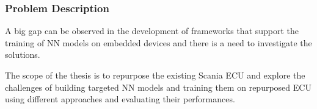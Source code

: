 

\subsubsection{Problem Description}
A big gap can be observed in the development of frameworks that support the training of NN models on embedded devices and there is a need to investigate the solutions.

The scope of the thesis is to repurpose the existing Scania ECU and explore the challenges of building targeted NN models and training them on repurposed ECU using different approaches and evaluating their performances.




